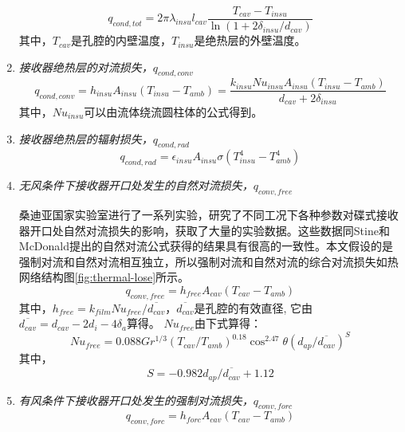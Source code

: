 \begin{enumerate}[label=(\arabic*)]
  \begin{equation}
q_{cond,tot}=2\pi\lambda_{insu}l_{cav}\dfrac{T_{cav}-T_{insu}}{\ln(1 + 2\delta_{insu}/d_{cav})}
    \end{equation}  
    其中，$T_{cav}$是孔腔的内壁温度，$T_{insu}$是绝热层的外壁温度。

  \item \emph{接收器绝热层的对流损失，$q_{cond,conv}$}  
  \begin{equation}
	q_{cond,conv}=h_{insu}A_{insu}(T_{insu}-T_{amb})
	=\dfrac{k_{insu}Nu_{insu}A_{insu}(T_{insu}-T_{amb})}{d_{cav}+2\delta_{insu}}
\end{equation}
其中，$Nu_{insu}$可以由流体绕流圆柱体的公式得到\cite{Churchill1977}。

  \item \emph{接收器绝热层的辐射损失，$q_{cond,rad}$}  
  \begin{equation}
	q_{cond,rad}=\epsilon_{insu}A_{insu}\sigma(T_{insu}^4 - T_{amb}^4)
\end{equation}
  \item \emph{无风条件下接收器开口处发生的自然对流损失，$q_{conv,free}$}
    
  桑迪亚国家实验室进行了一系列实验，研究了不同工况下各种参数对碟式接收器开口处自然对流损失的影响，获取了大量的实验数据\cite{Ma1993}。这些数据同Stine和McDonald提出的自然对流公式获得的结果具有很高的一致性。本文假设的是强制对流和自然对流相互独立，所以强制对流和自然对流的综合对流损失如热网络结构图\autoref{fig:thermal-lose}所示。
  \begin{equation}
	q_{conv,free} = h_{free}A_{cav}(T_{cav}-T_{amb})
\end{equation}
其中，$h_{free}=k_{film}Nu_{free}/\overline{d_{cav}}$，$\overline{d_{cav}}$是孔腔的有效直径, 它由$\overline{d_{cav}}=d_{cav}-2d_i-4 \delta_a$算得。
$Nu_{free}由下式算得$\cite{Jilte2013b}：
\begin{equation}
	Nu_{free} = 0.088Gr^{1/3}(T_{cav}/T_{amb})^{0.18}\cos^{2.47}\theta (d_{ap}/\overline{d_{cav}})^S
\end{equation}
其中，
\begin{equation}
	S = -0.982d_{ap}/\overline{d_{cav}} + 1.12
\end{equation}
  
  \item \emph{有风条件下接收器开口处发生的强制对流损失，$q_{conv,forc}$}  
  \begin{equation}
	q_{conv,forc} = h_{forc}A_{cav}(T_{cav}-T_{amb})
\end{equation}


\end{enumerate}
